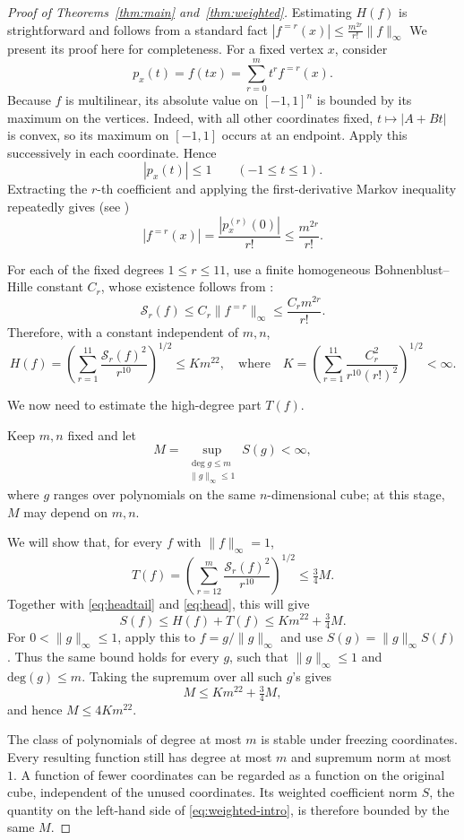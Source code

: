 \documentclass[11pt]{amsart}
\theoremstyle{remark}
\numberwithin{equation}{section}
\begin{document}
\begin{proof}[Proof of Theorems~\ref{thm:main} and~\ref{thm:weighted}]
Estimating $H(f)$ is strightforward and follows from a standard fact 
$|f^{=r}(x)|\le\frac{m^{2r}}{r!} \|f\|_{\infty}$
We present its proof here for
completeness. For a fixed vertex $x$, consider
\[
p_x(t)=f(tx)=\sum_{r=0}^m t^r f^{=r}(x).
\]
Because $f$ is multilinear, its absolute value on $[-1,1]^n$ is bounded by its
maximum on the vertices. Indeed, with all other coordinates fixed,
$t\mapsto|A+Bt|$ is convex, so its maximum on $[-1,1]$ occurs at an endpoint.
Apply this successively in each coordinate. Hence
\[
|p_x(t)|\le1\qquad(-1\le t\le1).
\]
Extracting the $r$-th coefficient and applying the first-derivative Markov
inequality repeatedly gives (see \cite[Section~5.1]{BE95})
\[
|f^{=r}(x)|=\frac{|p_x^{(r)}(0)|}{r!}\le\frac{m^{2r}}{r!}.
\]

For each of the fixed degrees $1\le r\le11$, use a finite homogeneous
Bohnenblust--Hille constant $C_r$, whose existence follows from \cite{DMP19}:
\[
\mathcal{S}_{r}(f)\le C_r\|f^{=r}\|_\infty\le\frac{C_r m^{2r}}{r!}.
\]
Therefore, with a constant independent of $m,n$,
\begin{equation}
H(f)=\left(\sum_{r=1}^{11}\frac{\mathcal{S}_{r}(f)^2}{r^{10}}\right)^{1/2}
\le K m^{22}, \quad \text{where} \quad K=\left(\sum_{r=1}^{11}\frac{C_r^2}{r^{10}(r!)^2}\right)^{1/2}<\infty.
\label{eq:head}
\end{equation}

We now need to estimate the high-degree part $T(f)$. 

Keep $m,n$ fixed and let
\[
M=\sup_{\substack{\deg g\le m\\\|g\|_\infty\le1}}S(g)<\infty,
\]
where $g$ ranges over polynomials on the same $n$-dimensional cube; at this
stage, $M$ may depend on $m,n$.

We will show that, for every $f$ with $\|f\|_\infty=1$,
\[
T(f)=\left(\sum_{r=12}^m\frac{\mathcal{S}_{r}(f)^2}{r^{10}}\right)^{1/2}
\le\tfrac34M.
\]
Together with \eqref{eq:headtail} and \eqref{eq:head}, this will give
\[
S(f)\le H(f)+T(f)\le Km^{22}+\tfrac34M.
\]
For $0<\|g\|_\infty\le1$, apply this to $f=g/\|g\|_\infty$ and use
$S(g)=\|g\|_\infty S(f)$.
Thus the same bound holds for every $g$, such that $\|g\|_{\infty}\leq 1$ and $\mathrm{deg}(g) \leq m$. 
Taking the supremum over all such $g$'s gives
\[
M\le Km^{22}+\tfrac34M,
\]
and hence $M\le4Km^{22}$.

The class of polynomials of degree at most $m$ is stable under freezing
coordinates. Every resulting function still has degree at most $m$ and
supremum norm at most $1$. A function of fewer coordinates can be regarded
as a function on the original cube, independent of the unused coordinates.
Its weighted coefficient norm $S$, the quantity on the left-hand side of
\eqref{eq:weighted-intro}, is therefore bounded by the same $M$.


\end{proof}
\end{document}
